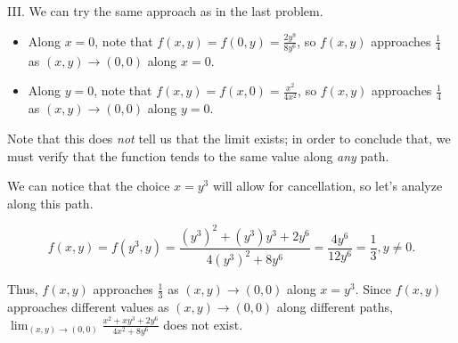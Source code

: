 \documentclass[noauthor, handout]{ximera}
\newcommand{\Lim}[2]{\lim_{#1 \to #2}}
\begin{document}
\begin{problem}
\begin{freeResponse}
III. We can try the same approach as in the last problem.

\begin{itemize}
\item Along $x=0$, note that $f(x,y) = f(0,y) = \frac{2y^9}{8y^6} $, so $f(x,y)$ approaches $\frac{1}{4}$ as $(x,y) \to (0,0)$ along $x=0$.
\item Along $y=0$, note that $f(x,y) = f(x,0) = \frac{x^2}{4x^2} $, so $f(x,y)$ approaches $\frac{1}{4}$ as $(x,y) \to (0,0)$ along $y=0$.
\end{itemize}

Note that this does \emph{not} tell us that the limit exists; in order to conclude that, we must verify that the function tends to the same value along \emph{any} path.

We can notice that the choice $x=y^3$ will allow for cancellation, so let's analyze along this path.

\[
f(x,y) = f(y^3,y) = \frac{\left(y^3\right)^2+\left(y^3\right)y^3+2y^6}{4\left(y^3\right)^2+8y^6} = \frac{4y^6}{12y^6} = \frac{1}{3}, y \neq 0.
\]

Thus, $f(x,y)$ approaches $\frac{1}{3}$ as $(x,y) \to (0,0)$ along $x=y^3$.  Since $f(x,y)$ approaches different values as $(x,y) \to (0,0)$ along different paths,  $\Lim{(x,y)}{(0,0)} \frac{x^2+xy^3+2y^6}{4x^2+8y^6}$ does not exist.
\end{freeResponse}
\end{problem}

\end{document}
